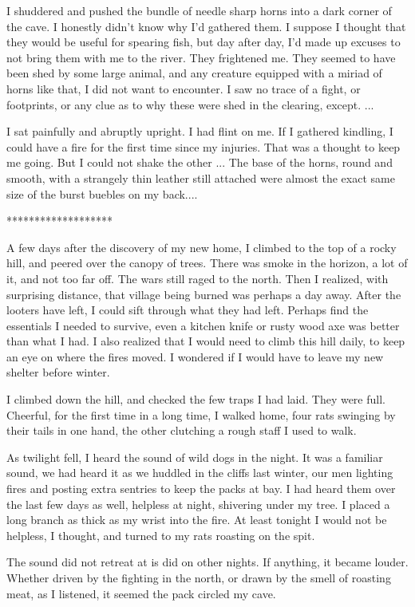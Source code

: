 I shuddered and pushed the bundle of needle sharp horns into a dark corner of the cave. I honestly didn't know why I'd gathered them. I suppose I thought that they would be useful for spearing fish, but day after day, I'd made up excuses to not bring them with me to the river. They frightened me. They seemed to have been shed by some large animal, and any creature equipped with a miriad of horns like that, I did not want to encounter. I saw no trace of a fight, or footprints, or any clue as to why these were shed in the clearing, except. ...

I sat painfully and abruptly upright. I had flint on me. If I gathered kindling, I could have a fire for the first time since my injuries. That was a thought to keep me going. But I could not shake the other ... The base of the horns, round and smooth, with a strangely thin leather still attached were almost the exact same size of the burst buebles on my back....

*******************

A few days after the discovery of my new home, I climbed to the top of a rocky hill, and peered over the canopy of trees. There was smoke in the horizon, a lot of it, and not too far off. The wars still raged to the north. Then I realized, with surprising distance, that village being burned was perhaps a day away. After the looters have left, I could sift through what they had left. Perhaps find the essentials I needed to survive, even a kitchen knife or rusty wood axe was better than what I had. I also realized that I would need to climb this hill daily, to keep an eye on where the fires moved. I wondered if I would have to leave my new shelter before winter.

I climbed down the hill, and checked the few traps I had laid. They were full. Cheerful, for the first time in a long time, I walked home, four rats swinging by their tails in one hand, the other clutching a rough staff I used to walk. 

As twilight fell, I heard the sound of wild dogs in the night. It was a familiar sound, we had heard it as we huddled in the cliffs last winter, our men lighting fires and posting extra sentries to keep the packs at bay. I had heard them over the last few days as well, helpless at night, shivering under my tree. I placed a long branch as thick as my wrist into the fire. At least tonight I would not be helpless, I thought, and turned to my rats roasting on the spit. 

The sound did not retreat at is did on other nights. If anything, it became louder. Whether driven by the fighting in the north, or drawn by the smell of roasting meat, as I listened, it seemed the pack circled my cave. 

